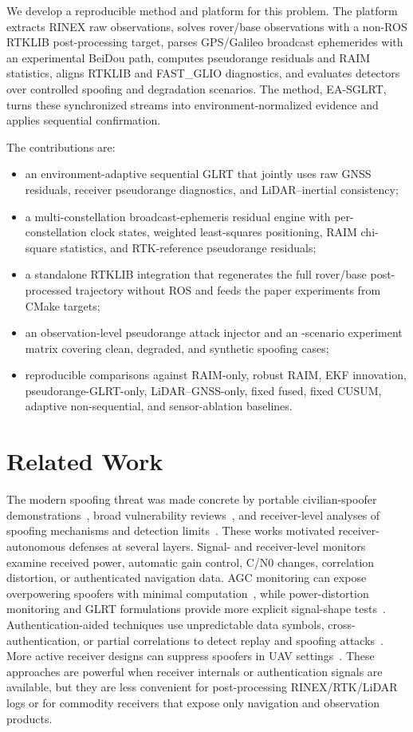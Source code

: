 \documentclass[journal]{IEEEtran}
\begin{document}
We develop a reproducible method and platform for this problem.
The platform extracts RINEX raw observations, solves rover/base observations with a non-ROS RTKLIB post-processing target, parses GPS/Galileo broadcast ephemerides with an experimental BeiDou path, computes pseudorange residuals and RAIM statistics, aligns RTKLIB and FAST\_GLIO diagnostics, and evaluates detectors over controlled spoofing and degradation scenarios.
The method, EA-SGLRT, turns these synchronized streams into environment-normalized evidence and applies sequential confirmation.

The contributions are:
\begin{itemize}
    \item an environment-adaptive sequential GLRT that jointly uses raw GNSS residuals, receiver pseudorange diagnostics, and LiDAR--inertial consistency;
    \item a multi-constellation broadcast-ephemeris residual engine with per-constellation clock states, weighted least-squares positioning, RAIM chi-square statistics, and RTK-reference pseudorange residuals;
    \item a standalone RTKLIB integration that regenerates the full rover/base post-processed trajectory without ROS and feeds the paper experiments from CMake targets;
    \item an observation-level pseudorange attack injector and an \MatrixScenarioCount{}-scenario experiment matrix covering clean, degraded, and synthetic spoofing cases;
    \item reproducible comparisons against RAIM-only, robust RAIM, EKF innovation, pseudorange-GLRT-only, LiDAR--GNSS-only, fixed fused, fixed CUSUM, adaptive non-sequential, and sensor-ablation baselines.
\end{itemize}

\section{Related Work}
The modern spoofing threat was made concrete by portable civilian-spoofer demonstrations~\cite{humphreys2008spoofer}, broad vulnerability reviews~\cite{jafarnia2012review}, and receiver-level analyses of spoofing mechanisms and detection limits~\cite{psiaki2016gnss}.
These works motivated receiver-autonomous defenses at several layers.
Signal- and receiver-level monitors examine received power, automatic gain control, C/N0 changes, correlation distortion, or authenticated navigation data.
AGC monitoring can expose overpowering spoofers with minimal computation~\cite{akos2012agc}, while power-distortion monitoring and GLRT formulations provide more explicit signal-shape tests~\cite{wesson2017powerdistortion,gross2017pdml}.
Authentication-aided techniques use unpredictable data symbols, cross-authentication, or partial correlations to detect replay and spoofing attacks~\cite{seco2021replay,ardizzon2023crossauth}.
More active receiver designs can suppress spoofers in UAV settings~\cite{sathaye2021semperfi}.
These approaches are powerful when receiver internals or authentication signals are available, but they are less convenient for post-processing RINEX/RTK/LiDAR logs or for commodity receivers that expose only navigation and observation products.
\end{document}
